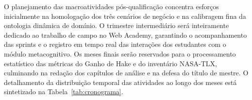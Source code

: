 \documentclass[ruledheader]{abnt_UFF}[abntex2]
\begin{document}
O planejamento das macroatividades pós-qualificação concentra esforços inicialmente na homologação dos três cenários de negócio e na calibragem fina da ontologia dinâmica de domínio. O trimestre intermediário será inteiramente dedicado ao trabalho de campo no Web Academy, garantindo o acompanhamento das sprints e o registro em tempo real das interações dos estudantes com o módulo metacognitivo. Os meses finais serão reservados para o processamento estatístico das métricas do Ganho de Hake e do inventário NASA-TLX, culminando na redação dos capítulos de análise e na defesa do título de mestre. O detalhamento da distribuição temporal das atividades ao longo dos meses está sintetizado na Tabela~\ref{tab:cronograma}.

\begin{table}[h!]
\centering
\caption{Cronograma de atividades distribuído ao longo dos 12 meses de pesquisa}
\label{tab:cronograma}
\end{table}

    \cleardoublepage

\end{document}
